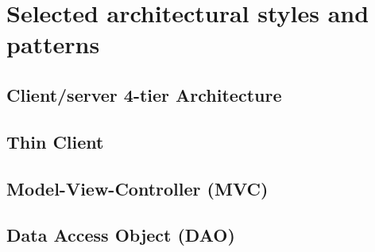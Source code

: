 \documentclass[../../DD.tex]{subfiles}
\begin{document}
\section{Selected architectural styles and patterns\label{sect:2.6}}

\subsection{Client/server 4-tier Architecture\label{2.6.1}}


\subsection{Thin Client\label{2.6.2}}


\subsection{Model-View-Controller (MVC)\label{2.6.3}}


\subsection{Data Access Object (DAO)\label{2.6.4}}


\newpage
\end{document}
